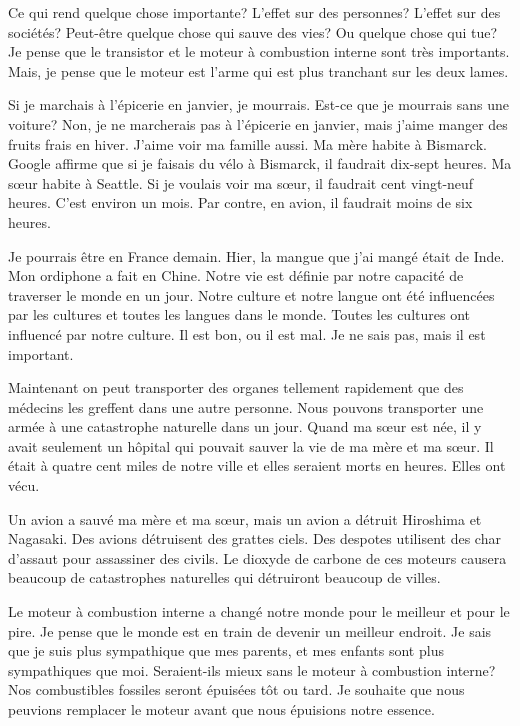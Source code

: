 \documentclass[letterpaper]{article}
\begin{document}
\doublespacing
Ce qui rend quelque chose importante? L'effet sur des personnes? L'effet sur des sociétés? Peut-être quelque chose qui sauve des vies? Ou quelque chose qui tue? Je pense que le transistor et le moteur à combustion interne sont très importants. Mais, je pense que le moteur est l'arme qui est plus tranchant sur les deux lames.

Si je marchais à l'épicerie en janvier, je mourrais. Est-ce que je mourrais sans une voiture? Non, je ne marcherais pas à l'épicerie en janvier, mais j'aime manger des fruits frais en hiver. J'aime voir ma famille aussi. Ma mère habite à Bismarck. Google affirme que si je faisais du vélo à Bismarck, il faudrait dix-sept heures. Ma sœur habite à Seattle. Si je voulais voir ma sœur, il faudrait cent vingt-neuf heures. C'est environ un mois. Par contre, en avion, il faudrait moins de six heures.

Je pourrais être en France demain. Hier, la mangue que j'ai mangé était de Inde. Mon ordiphone a fait en Chine. Notre vie est définie par notre capacité de traverser le monde en un jour. Notre culture et notre langue ont été influencées par les cultures et toutes les langues dans le monde. Toutes les cultures ont influencé par notre culture. Il est bon, ou il est mal. Je ne sais pas, mais il est important.

Maintenant on peut transporter des organes tellement rapidement que des médecins les greffent dans une autre personne. Nous pouvons transporter une armée à une catastrophe naturelle dans un jour. Quand ma sœur est née, il y avait seulement un hôpital qui pouvait sauver la vie de ma mère et ma sœur. Il était à quatre cent miles de notre ville et elles seraient morts en heures. Elles ont vécu.

Un avion a sauvé ma mère et ma sœur, mais un avion a détruit Hiroshima et Nagasaki. Des avions détruisent des grattes ciels. Des despotes utilisent des char d'assaut pour assassiner des civils. Le dioxyde de carbone de ces moteurs causera beaucoup de catastrophes naturelles qui détruiront beaucoup de villes.

Le moteur à combustion interne a changé notre monde pour le meilleur et pour le pire. Je pense que le monde est en train de devenir un meilleur endroit. Je sais que je suis plus sympathique que mes parents, et mes enfants sont plus sympathiques que moi. Seraient-ils mieux sans le moteur à combustion interne? Nos combustibles fossiles seront épuisées tôt ou tard. Je souhaite que nous peuvions remplacer le moteur avant que nous épuisions notre essence.
\end{document}
